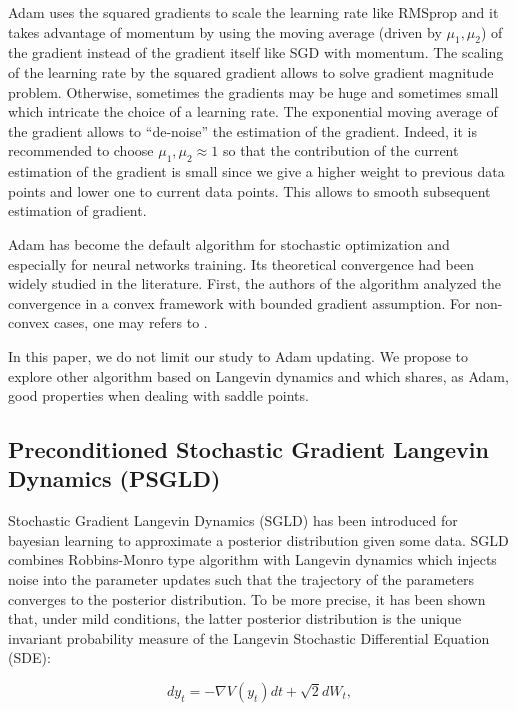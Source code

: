 \documentclass{article}
\newcommand{\q}[1]{``#1''}
\renewcommand{\q}[1]{``#1''}
\numberwithin{equation}{section}
\begin{document}
Adam uses the squared gradients to scale the learning rate like RMSprop and it takes advantage of momentum by using the moving average (driven by $\mu_1, \mu_2$) of the gradient instead of the gradient itself like SGD with momentum. The scaling of the learning rate by the squared gradient allows to solve gradient magnitude problem. Otherwise, sometimes the gradients may be huge and sometimes small which intricate the choice of a learning rate. The exponential moving average of the gradient allows to \q{de-noise} the estimation of the gradient. Indeed, it is recommended to choose $\mu_1, \mu_2 \approx 1$ so that the contribution of the current estimation of the gradient is small since we give a higher weight to previous data points and lower one to current data points. This allows to smooth subsequent estimation of gradient.


Adam has become the default algorithm for stochastic optimization and especially for neural networks training. Its theoretical convergence had been widely studied in the literature. First, the authors of the algorithm analyzed the convergence in a convex framework with bounded gradient assumption. For non-convex cases, one may refers to \cite{Defossez2020ASC, Zou2018ASC}. 


In this paper, we do not limit our study to Adam updating. We propose to explore other algorithm based on Langevin dynamics and which shares, as Adam, good properties when dealing with saddle points.

\subsection{Preconditioned Stochastic Gradient Langevin Dynamics (PSGLD)}

\indent

Stochastic Gradient Langevin Dynamics (SGLD) has been introduced for bayesian learning \cite{Welling2011BayesianLV} to approximate a posterior distribution given some data. SGLD combines Robbins-Monro type algorithm with Langevin dynamics which injects noise into the parameter updates such
that the trajectory of the parameters converges to the posterior distribution. To be more precise, it has been shown that, under mild conditions, the latter posterior distribution is the unique invariant probability measure of the Langevin Stochastic Differential Equation (SDE):

\begin{equation}
\label{langevin_sde}
dy_t = - \nabla V(y_t) dt + \sqrt{2}dW_t,
\end{equation}
\end{document}
